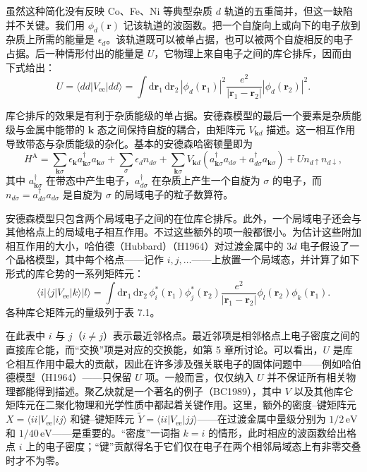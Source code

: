 虽然这种简化没有反映 Co、Fe、Ni 等典型杂质 $d$ 轨道的五重简并，但这一缺陷并不关键。我们用 $\phi_{d}(\mathbf{r})$ 记该轨道的波函数。把一个自旋向上或向下的电子放到杂质上所需的能量是 $\epsilon_{d}$。该轨道既可以被单占据，也可以被两个自旋相反的电子占据。后一种情形付出的能量是 $U$，它物理上来自电子之间的库仑排斥，因而由下式给出：
\begin{equation*}
U=\langle dd|V_{\mathrm{ee}}|dd\rangle=\int\mathrm{d}\mathbf{r}_{1}\,\mathrm{d}\mathbf{r}_{2}\,|\phi_{d}(\mathbf{r}_{1})|^{2}\frac{e^{2}}{|\mathbf{r}_{1}-\mathbf{r}_{2}|}|\phi_{d}(\mathbf{r}_{2})|^{2}.\tag{7.1}
\end{equation*}

库仑排斥的效果是有利于杂质能级的单占据。安德森模型的最后一个要素是杂质能级与金属中能带的 $\mathbf{k}$ 态之间保持自旋的耦合，由矩阵元 $V_{\mathbf{k}d}$ 描述。这一相互作用导致带态与杂质能级的杂化。基本的安德森哈密顿量即为
\begin{equation*}
H^{\mathrm{A}}=\sum_{\mathbf{k}\sigma}\epsilon_{\mathbf{k}}a_{\mathbf{k}\sigma}^{\dagger}a_{\mathbf{k}\sigma}+\sum_{\sigma}\epsilon_{d}n_{d\sigma}+\sum_{\mathbf{k}\sigma}V_{\mathbf{k}d}\left(a_{\mathbf{k}\sigma}^{\dagger}a_{d\sigma}+a_{d\sigma}^{\dagger}a_{\mathbf{k}\sigma}\right)+Un_{d\uparrow}n_{d\downarrow},\tag{7.2}
\end{equation*}
其中 $a_{\mathbf{k}\sigma}^{\dagger}$ 在带态中产生电子，$a_{d\sigma}^{\dagger}$ 在杂质上产生一个自旋为 $\sigma$ 的电子，而 $n_{d\sigma}=a_{d\sigma}^{\dagger}a_{d\sigma}$ 是自旋为 $\sigma$ 的局域电子的粒子数算符。

安德森模型只包含两个局域电子之间的在位库仑排斥。此外，一个局域电子还会与其他格点上的局域电子相互作用。不过这些额外的项一般都很小。为估计这些附加相互作用的大小，哈伯德（Hubbard）（H1964）对过渡金属中的 $3d$ 电子假设了一个晶格模型，其中每个格点——记作 $i,j,\dotsc$——上放置一个局域态，并计算了如下形式的库仑势的一系列矩阵元：
\begin{equation*}
\langle i|\langle j|V_{\mathrm{ee}}|k\rangle|l\rangle=\int\mathrm{d}\mathbf{r}_{1}\,\mathrm{d}\mathbf{r}_{2}\,\phi_{i}^{*}(\mathbf{r}_{1})\phi_{j}^{*}(\mathbf{r}_{2})\frac{e^{2}}{|\mathbf{r}_{1}-\mathbf{r}_{2}|}\phi_{l}(\mathbf{r}_{2})\phi_{k}(\mathbf{r}_{1}).\tag{7.3}
\end{equation*}
各种库仑矩阵元的量级列于表 7.1。

在此表中 $i$ 与 $j$（$i\neq j$）表示最近邻格点。最近邻项是相邻格点上电子密度之间的直接库仑能，而“交换”项是对应的交换能，如第 5 章所讨论。可以看出，$U$ 是库仑相互作用中最大的贡献，因此在许多涉及强关联电子的固体问题中——例如哈伯德模型（H1964）——只保留 $U$ 项。一般而言，仅仅纳入 $U$ 并不保证所有相关物理都能得到描述。聚乙炔就是一个著名的例子（BC1989），其中 $V$ 以及其他库仑矩阵元在二聚化物理和光学性质中都起着关键作用。这里，额外的密度–键矩阵元 $X=\langle ii|V_{\mathrm{ee}}|ij\rangle$ 和键–键矩阵元 $\tilde{Y}=\langle ii|V_{\mathrm{ee}}|jj\rangle$——在过渡金属中量级分别为 $1/2\,\mathrm{eV}$ 和 $1/40\,\mathrm{eV}$——是重要的。“密度”一词指 $k=i$ 的情形，此时相应的波函数给出格点 $i$ 上的电子密度；“键”贡献得名于它们仅在电子在两个相邻局域态上有非零交叠时才不为零。

